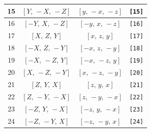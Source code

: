 \documentclass[fleqn,8pt]{jsarticle}
\begin{document}
\begin{longtable}{cccc}
15 & $\left[ Y,\, - X,\, - Z \right]$ & $\left[ y,\, - x,\, - z \right]$ & {\tt [15]} \\ \hline
16 & $\left[ - Y,\, X,\, - Z \right]$ & $\left[ - y,\, x,\, - z \right]$ & {\tt [16]} \\ \hline
17 & $\left[ X,\, Z,\, Y \right]$ & $\left[ x,\, z,\, y \right]$ & {\tt [17]} \\ \hline
18 & $\left[ - X,\, Z,\, - Y \right]$ & $\left[ - x,\, z,\, - y \right]$ & {\tt [18]} \\ \hline
19 & $\left[ - X,\, - Z,\, Y \right]$ & $\left[ - x,\, - z,\, y \right]$ & {\tt [19]} \\ \hline
20 & $\left[ X,\, - Z,\, - Y \right]$ & $\left[ x,\, - z,\, - y \right]$ & {\tt [20]} \\ \hline
21 & $\left[ Z,\, Y,\, X \right]$ & $\left[ z,\, y,\, x \right]$ & {\tt [21]} \\ \hline
22 & $\left[ Z,\, - Y,\, - X \right]$ & $\left[ z,\, - y,\, - x \right]$ & {\tt [22]} \\ \hline
23 & $\left[ - Z,\, Y,\, - X \right]$ & $\left[ - z,\, y,\, - x \right]$ & {\tt [23]} \\ \hline
24 & $\left[ - Z,\, - Y,\, X \right]$ & $\left[ - z,\, - y,\, x \right]$ & {\tt [24]} \\
\end{longtable}
\end{document}
